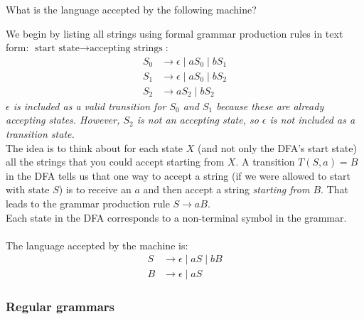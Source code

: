 \documentclass[11pt]{article}
\newcommand{\ex}[0]{\tcbhighmath[boxrule=0.5mm, colframe=pink, colback=pink, arc=10mm, size=fbox]{\textbf{Ex:}}}
\begin{document}
\ex What is the language accepted by the following machine?
\begin{center}
\end{center}

We begin by listing all strings using formal grammar production rules in text form: $\text{start state} \to \text{accepting strings}$:
$$
\begin{aligned}
  S_0 &\to \epsilon \mid a S_0 \mid b S_1 \\
  S_1 &\to \epsilon \mid a S_0 \mid b S_2 \\
  S_2 &\to a S_2 \mid b S_2
\end{aligned}
$$
\textit{$\epsilon$ is included as a valid transition for $S_0$ and $S_1$ because these are already accepting states. However, $S_2$ is not an accepting state, so $\epsilon$ is not included as a transition state.}\\

The idea is to think about for each state $X$ (and not only the DFA’s start state) all the strings that you could accept starting from $X$.
A transition $T(S, a) = B$ in the DFA tells us that one way
to accept a string (if we were allowed to start with state $S$) is to receive an $a$ and then accept a string \textit{starting from $B$}.
That leads to the grammar production rule $S \to a B$.\\
Each state in the DFA corresponds to a non-terminal symbol in the grammar.\\\\
The language accepted by the machine is:
$$
\begin{aligned}
  S &\to \epsilon \mid a S \mid b B \\
  B &\to \epsilon \mid a S
\end{aligned}
$$

\subsubsection{Regular grammars}
\end{document}
